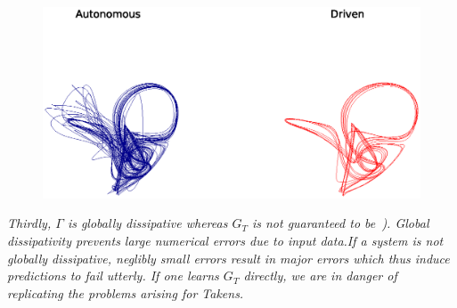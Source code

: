 \documentclass[a4paper,12pt,twoside]{report}
\newtheorem{Definition}{Definition}[]
\begin{document}
\begin{figure}[ht]
  \includegraphics[scale=0.5]{_AutovsDriven.eps}
  \centering
  \label{fig:learningFailure}
\end{figure}

\emph{Thirdly, $\Gamma$ is globally dissipative whereas $G_T$ is not guaranteed to be~\cite{manjunath2021universal}). 
Global dissipativity prevents large numerical errors due to input data.If a system is not globally dissipative, neglibly small errors result in major errors which thus induce predictions to fail utterly. If one learns $G_T$ directly, we are in danger of replicating the problems arising for Takens. }




\end{document}
